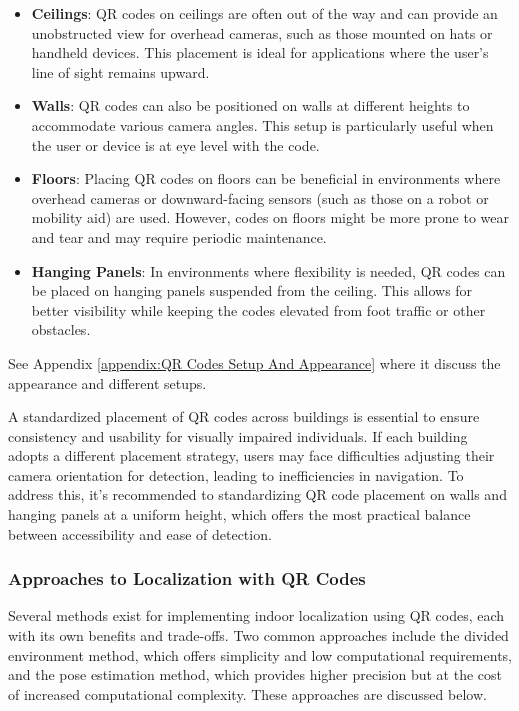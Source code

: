 \begin{itemize}
	\item \textbf{Ceilings}: QR codes on ceilings are often out of the way and can provide an unobstructed view for overhead cameras, such as those mounted on hats or handheld devices. This placement is ideal for applications where the user’s line of sight remains upward.
	
	\item \textbf{Walls}: QR codes can also be positioned on walls at different heights to accommodate various camera angles. This setup is particularly useful when the user or device is at eye level with the code.
	
	\item \textbf{Floors}: Placing QR codes on floors can be beneficial in environments where overhead cameras or downward-facing sensors (such as those on a robot or mobility aid) are used. However, codes on floors might be more prone to wear and tear and may require periodic maintenance.
	
	\item \textbf{Hanging Panels}: In environments where flexibility is needed, QR codes can be placed on hanging panels suspended from the ceiling. This allows for better visibility while keeping the codes elevated from foot traffic or other obstacles.
\end{itemize}

See Appendix \ref{appendix:QR Codes Setup And Appearance} where it discuss the appearance and different setups.

A standardized placement of QR codes across buildings is essential to ensure consistency and usability for visually impaired individuals. If each building adopts a different placement strategy, users may face difficulties adjusting their camera orientation for detection, leading to inefficiencies in navigation. To address this, it's recommended to standardizing QR code placement on walls and hanging panels at a uniform height, which offers the most practical balance between accessibility and ease of detection.

\subsubsection{Approaches to Localization with QR Codes}

Several methods exist for implementing indoor localization using QR codes, each with its own benefits and trade-offs. Two common approaches include the divided environment method, which offers simplicity and low computational requirements, and the pose estimation method, which provides higher precision but at the cost of increased computational complexity. These approaches are discussed below.


